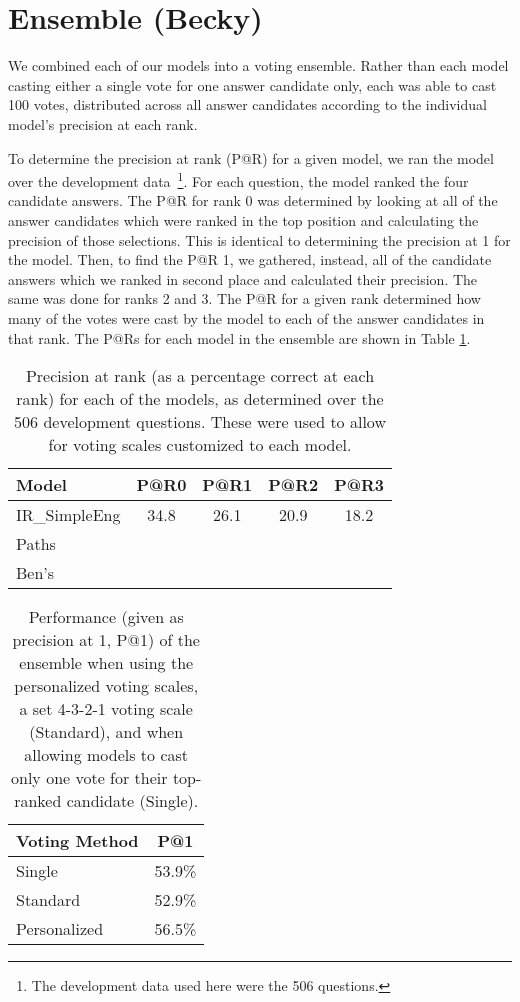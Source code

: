 \section{Ensemble (Becky)}
\label{sec:ensemble}

We combined each of our models into a voting ensemble.  Rather than each model casting either a single vote for one answer candidate only, each was able to cast 100 votes, distributed across all answer candidates according to the individual model's precision at each rank.

To determine the precision at rank (P@R) for a given model, we ran the model over the development data~\footnote{The development data used here were the 506 questions.}.  For each question, the model ranked the four candidate answers.  The P@R for rank 0 was determined by looking at all of the answer candidates which were ranked in the top position and calculating the precision of those selections.  This is identical to determining the precision at 1 for the model.  Then, to find the P@R 1, we gathered, instead, all of the candidate answers which we ranked in second place and calculated their precision.  The same was done for ranks 2 and 3.  The P@R for a given rank determined how many of the votes were cast by the model to each of the answer candidates in that rank.  The P@Rs for each model in the ensemble are shown in Table \ref{tab:p@r}.

\begin{table}[H]
\caption{Precision at rank (as a percentage correct at each rank) for each of the models, as determined over the 506 development questions.  These were used to allow for voting scales customized to each model.}
\begin{center}
\begin{tabular}{lcccc}
Model & P@R0 & P@R1 & P@R2 & P@R3\\
\hline
IR\_SimpleEng & 34.8 & 26.1 & 20.9 & 18.2 \\
Paths &  &  &  &  \\
Ben's &  &  &  &  \\

\end{tabular}
\end{center}
\label{tab:p@r}
\end{table}%

\begin{table}[H]
\caption{Performance (given as precision at 1, P@1) of the ensemble when using the personalized voting scales, a set 4-3-2-1 voting scale (Standard), and when allowing models to cast only one vote for their top-ranked candidate (Single).}
\begin{center}
\begin{tabular}{lc}
Voting Method & P@1 \\
\hline
Single 		& 53.9\%	\\
Standard 	& 52.9\% \\
Personalized 	& 56.5\% 	\\

\end{tabular}
\end{center}
\label{tab:ensemblemethods}
\end{table}%
	

